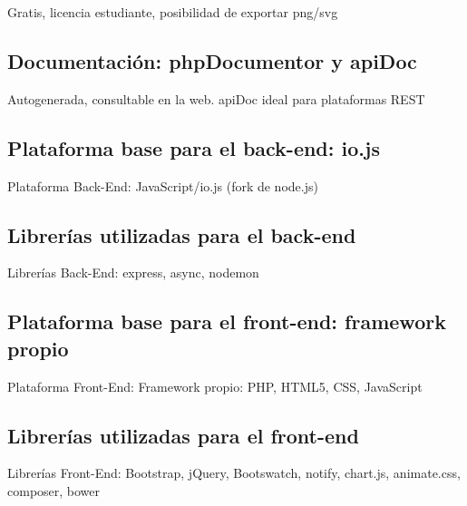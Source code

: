 Gratis, licencia estudiante, posibilidad de exportar png/svg

\cite{cacoo}


\subsection*{Documentación: phpDocumentor y apiDoc\label{ssec:dp:docs}}

Autogenerada, consultable en la web. apiDoc ideal para plataformas REST
\cite{apidoc}
\cite{phpdocumentor}

\subsection*{Plataforma base para el \gls{back-end}: io.js\label{ssec:dp:back-end}}

Plataforma Back-End: JavaScript/io.js (fork de node.js)
\cite{iojs}
\cite{nodejs}
\cite{javascript}

\subsection*{Librerías utilizadas para el \gls{back-end}\label{ssec:dp:back-end-libs}}

Librerías Back-End: express, async, nodemon
\cite{express}
\cite{async}
\cite{nodemon}

\subsection*{Plataforma base para el \gls{front-end}: \gls{framework} propio\label{ssec:dp:front-end}}

Plataforma Front-End: Framework propio: PHP, HTML5, CSS, JavaScript
\cite{php}
\cite{html5}
\cite{css}

\subsection*{Librerías utilizadas para el \gls{front-end}\label{ssec:dp:front-end-libs}}

Librerías Front-End: Bootstrap, jQuery, Bootswatch, notify, chart.js, animate.css, composer, bower

\cite{bootstrap}
\cite{bootstraptable}
\cite{jquery}
\cite{bootswatch}
\cite{bootstrapnotify}
\cite{chartjs}
\cite{animatecss}

\cite{composer}
\cite{bowerphp}